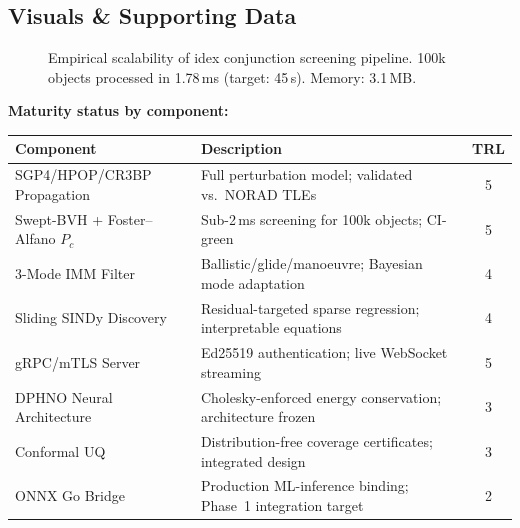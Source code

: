 \documentclass[11pt,a4paper]{article}
\begin{document}
\subsection{Visuals \& Supporting Data}

\begin{figure}[h]
\centering
{}
\caption{Empirical scalability of idex conjunction screening pipeline.
100k objects processed in 1.78\,ms (target: 45\,s). Memory: 3.1\,MB.}
\end{figure}

\textbf{Maturity status by component:}

\renewcommand{\arraystretch}{1.2}
\begin{tabularx}{\textwidth}{l Y c}
\toprule
\textbf{Component} & \textbf{Description} & \textbf{TRL} \\
\midrule
SGP4/HPOP/CR3BP Propagation  & Full perturbation model; validated vs.\ NORAD TLEs          & 5 \\
Swept-BVH + Foster--Alfano $P_c$ & Sub-2\,ms screening for 100k objects; CI-green              & 5 \\
3-Mode IMM Filter            & Ballistic/glide/manoeuvre; Bayesian mode adaptation          & 4 \\
Sliding SINDy Discovery      & Residual-targeted sparse regression; interpretable equations & 4 \\
gRPC/mTLS Server             & Ed25519 authentication; live WebSocket streaming             & 5 \\
DPHNO Neural Architecture    & Cholesky-enforced energy conservation; architecture frozen   & 3 \\
Conformal UQ                 & Distribution-free coverage certificates; integrated design   & 3 \\
ONNX Go Bridge               & Production ML-inference binding; Phase~1 integration target  & 2 \\
\bottomrule
\end{tabularx}
\end{document}
